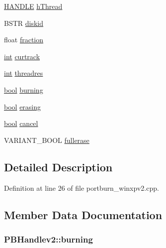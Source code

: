 \begin{DoxyCompactItemize}
\item 
\hyperlink{_sound_touch_d_l_l_8h_aa8c0374618b33785ccb02f74bcfebc46}{H\+A\+N\+D\+LE} \hyperlink{struct_p_b_handlev2_a9432074fbafca830cb4be9f84090a659}{h\+Thread}
\item 
B\+S\+TR \hyperlink{struct_p_b_handlev2_a1ad0eba4b5b78e15feb16db5f3c3ddd4}{diskid}
\item 
float \hyperlink{struct_p_b_handlev2_a93a1204aa5b9aec97cac7341d538363f}{fraction}
\item 
\hyperlink{xmltok_8h_a5a0d4a5641ce434f1d23533f2b2e6653}{int} \hyperlink{struct_p_b_handlev2_a3c343bdc80d8687dba13f4152f2a02d9}{curtrack}
\item 
\hyperlink{xmltok_8h_a5a0d4a5641ce434f1d23533f2b2e6653}{int} \hyperlink{struct_p_b_handlev2_a2dedb4363dacef0ed4fd1716f8674008}{threadres}
\item 
\hyperlink{mac_2config_2i386_2lib-src_2libsoxr_2soxr-config_8h_abb452686968e48b67397da5f97445f5b}{bool} \hyperlink{struct_p_b_handlev2_a5e5fd56aef7079c876cccf99e683adc7}{burning}
\item 
\hyperlink{mac_2config_2i386_2lib-src_2libsoxr_2soxr-config_8h_abb452686968e48b67397da5f97445f5b}{bool} \hyperlink{struct_p_b_handlev2_a46798afd2891f6837f5484556426f385}{erasing}
\item 
\hyperlink{mac_2config_2i386_2lib-src_2libsoxr_2soxr-config_8h_abb452686968e48b67397da5f97445f5b}{bool} \hyperlink{struct_p_b_handlev2_a7e9c5d7d155f5554fdea8da8c447da40}{cancel}
\item 
V\+A\+R\+I\+A\+N\+T\+\_\+\+B\+O\+OL \hyperlink{struct_p_b_handlev2_ab241ac3e8f634a39ec13f016261d8b61}{fullerase}
\end{DoxyCompactItemize}


\subsection{Detailed Description}


Definition at line 26 of file portburn\+\_\+winxpv2.\+cpp.



\subsection{Member Data Documentation}
\subsubsection[{\texorpdfstring{burning}{burning}}]{ P\+B\+Handlev2\+::burning}\hypertarget{struct_p_b_handlev2_a5e5fd56aef7079c876cccf99e683adc7}{}\label{struct_p_b_handlev2_a5e5fd56aef7079c876cccf99e683adc7}


